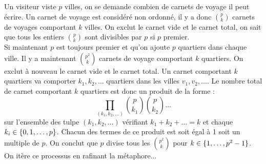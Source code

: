 

\pagestyle{fancy}

\fancyhead[C]{}
\fancyhead[R]{}



Un visiteur viste $p$ villes, on se demande combien de carnets de voyage il peut écrire.
Un carnet de voyage est considéré non ordonné, il y a donc $\binom{p}{k}$ carnets de voyages comportant $k$ villes.
On exclut le carnet vide et le carnet total, on sait que tous les entiers $\binom{p}{k}$ sont divisibles par $p$ si $p$ premier. \\

Si maintenant $p$ est toujours premier et qu'on ajoute $p$ quartiers dans chaque ville. 
Il y a maintenant $\binom{p^2}{k}$ carnets de voyage comportant $k$ quartiers.
On exclut à nouveau le carnet vide et le carnet total. Un carnet comportant $k$ quartiers va comporter $k_1, k_2, \dots$ quartiers dans les
villes $v_1, v_2, \dots$. 
Le nombre total de carnet comportant $k$ quartiers est donc un produit de la forme :
\[ \prod_{(k_1, k_2, \dots) } \binom{p}{k_1} \binom{p}{k_2} \dots \]
sur l'ensemble des tulpe $(k_1, k_2, \dots)$ vérifiant $k_1 + k_2 + \dots = k$ et chaque $k_i \in \{ 0, 1, \dots, p \}$.
Chacun des termes de ce produit est soit égal à 1 soit un multiple de $p$. 
On conclut que $p$ divise tous les $\binom{p^2}{k}$ pour $k \in \{ 1, \dots, p^2-1 \}$. \\

On itère ce processus en rafinant la métaphore...

